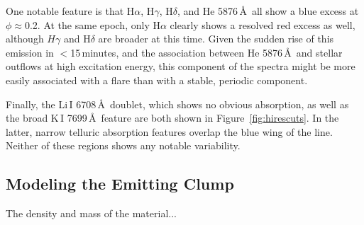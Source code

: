 \documentclass{nature3}
\begin{document}
\begin{methods}
One notable feature is that H$\alpha$, H$\gamma$, H$\delta$, and He
5876\,\AA\ all show a blue excess at $\phi$$\approx$0.2.  At the same
epoch, only H$\alpha$ clearly shows a resolved red excess as well,
although $H\gamma$ and H$\delta$ are broader at this time.  Given the
sudden rise of this emission in $<$15\,minutes, and the association
between He 5876\,\AA\ and stellar outflows at high excitation energy,
this component of the spectra might be more easily associated with a
flare than with a stable, periodic component.

Finally, the Li\,\textsc{I} 6708\,\AA\ doublet, which shows no obvious
absorption, as well as the broad K\,\textsc{I} 7699\,\AA\ feature are
both shown in Figure~\ref{fig:hirescuts}.  In the latter, narrow
telluric absorption features overlap the blue wing of the line.
Neither of these regions shows any notable variability.

%
%
%
%
%
%



\subsection{Modeling the Emitting Clump}
\label{subsec:model}

The density and mass of the material...





\end{methods}
\end{document}
